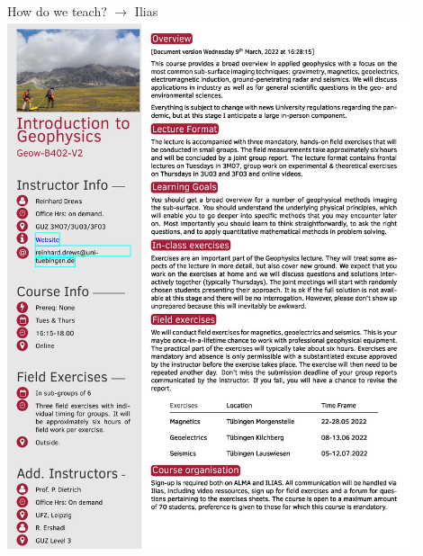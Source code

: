 \begin{frame}
    \begin{PointSix}{How do we teach? $\rightarrow$ Ilias}
        \includegraphics[width=0.90\textwidth]{Figures/General/LectureOutline_PageOne.jpg}
    \end{PointSix}
\end{frame}
